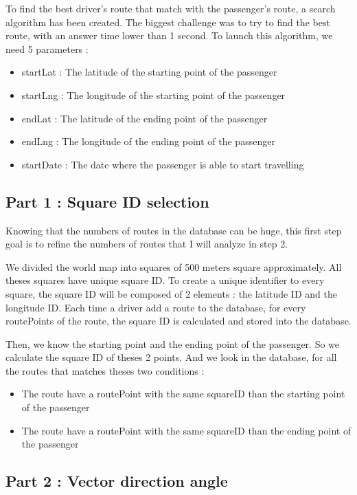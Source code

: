To find the best driver's route that match with the passenger's route, a search algorithm has been created. The biggest challenge was to try to find the best route, with an answer time lower than 1 second. To launch this algorithm, we need 5 parameters :

\begin{itemize}
    	\item startLat : The latitude of the starting point of the passenger
    	\item startLng : The longitude of the starting point of the passenger
    	\item endLat : The latitude of the ending point of the passenger
    	\item endLng : The longitude of the ending point of the passenger
    	\item startDate : The date where the passenger is able to start travelling
\end{itemize}


\subsection{Part 1 : Square ID selection}
Knowing that the numbers of routes in the database can be huge, this first step goal is to refine the numbers of routes that I will analyze in step 2.

We divided the world map into squares of 500 meters square approximately. All theses squares have unique square ID. To create a unique identifier to every square, the square ID will be composed of 2 elements : the latitude ID and the longitude ID.  Each time a driver add a route to the database, for every routePoints of the route, the square ID is calculated and stored into the database.

Then, we know the starting point and the ending point of the passenger. So we calculate the square ID of theses 2 points. And we look in the database, for all the routes that matches theses two conditions :
\begin{itemize}
	\item The route have a routePoint with the same squareID than the starting point of the passenger
	\item The route have a routePoint with the same squareID than the ending point of the passenger
\end{itemize}


\subsection{Part 2 : Vector direction angle}

